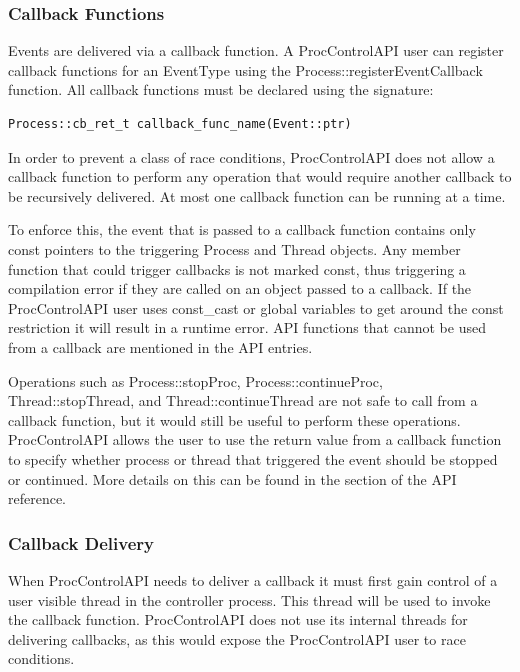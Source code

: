 \subsubsection{Callback Functions}
Events are delivered via a
callback function. A ProcControlAPI user can register callback functions for
an EventType using the Process::registerEventCallback function. All callback
functions must be declared using the signature:

\begin{lstlisting}
Process::cb_ret_t callback_func_name(Event::ptr)
\end{lstlisting}

In order to prevent a class of race conditions, ProcControlAPI does not allow a
callback function to perform any operation that would require another callback
to be recursively delivered. At most one callback function can be running at
a time.

To enforce this, the event that is passed to a callback function contains only
const pointers to the triggering Process and Thread objects. Any member
function that could trigger callbacks is not marked const, thus triggering a
compilation error if they are called on an object passed to a callback. If
the ProcControlAPI user uses const\_cast or global variables to get around the
const restriction it will result in a runtime error. API functions that
cannot be used from a callback are mentioned in the API entries.

Operations such as Process::stopProc, Process::continueProc, Thread::stopThread, and
Thread::continueThread are not safe to
call from a callback function, but it would still be useful to perform these
operations. ProcControlAPI allows the user to use the return value from a
callback function to specify whether process or thread that triggered the event
should be stopped or continued. More details on this can be found in the
 section of the API reference.

\subsubsection{Callback Delivery}
\label{subsubsec:callback-delivery}
When ProcControlAPI needs to
deliver a callback it must first gain control of a user visible thread in the
controller process. This thread will be used to invoke the callback
function. ProcControlAPI does not use its
internal threads for delivering callbacks, as this would expose the
ProcControlAPI user to race conditions.

